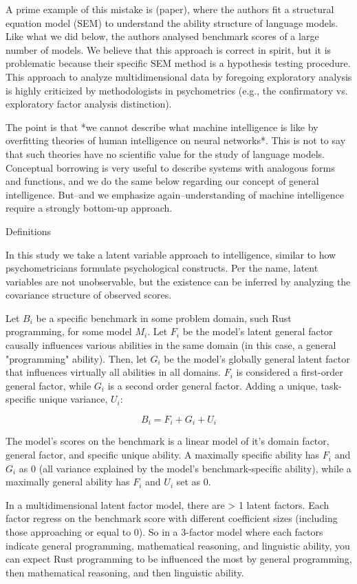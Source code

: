 A prime example of this mistake is (paper), where the authors fit a structural equation model (SEM) to understand the ability structure of language models. Like what we did below, the authors analysed benchmark scores of a large number of models. We believe that this approach is correct in spirit, but it is problematic because their specific SEM method is a hypothesis testing procedure. This approach to analyze multidimensional data by foregoing exploratory analysis is highly criticized by methodologists in psychometrics (e.g., the confirmatory vs. exploratory factor analysis distinction).

The point is that *we cannot describe what machine intelligence is like by overfitting theories of human intelligence on neural networks*. This is not to say that such theories have no scientific value for the study of language models. Conceptual borrowing is very useful to describe systems with analogous forms and functions, and we do the same below regarding our concept of general intelligence. But--and we emphasize again--understanding of machine intelligence require a strongly bottom-up approach.

Definitions

In this study we take a latent variable approach to intelligence, similar to how psychometricians formulate psychological constructs. Per the name, latent variables are not unobservable, but the existence can be inferred by analyzing the covariance structure of observed scores.

Let $B_i$ be a specific benchmark in some problem domain, such Rust programming, for some model $M_i$. Let $F_i$ be the model's latent general factor causally influences various abilities in the same domain (in this case, a general "programming" ability). Then, let $G_i$ be the model's globally general latent factor that influences virtually all abilities in all domains. $F_i$ is considered a first-order general factor, while $G_i$ is a second order general factor. Adding a unique, task-specific unique variance, $U_i$:

$$B_i = F_i + G_i + U_i$$

The model's scores on the benchmark is a linear model of it's domain factor, general factor, and specific unique ability. A maximally specific ability has $F_i$ and $G_i$ as 0 (all variance explained by the model's benchmark-specific ability), while a maximally general ability has $F_i$ and $U_i$ set as 0.

In a multidimensional latent factor model, there are > 1 latent factors. Each factor regress on the benchmark score with different coefficient sizes (including those approaching or equal to 0). So in a 3-factor model where each factors indicate general programming, mathematical reasoning, and linguistic ability, you can expect Rust programming to be influenced the most by general programming, then mathematical reasoning, and then linguistic ability.

